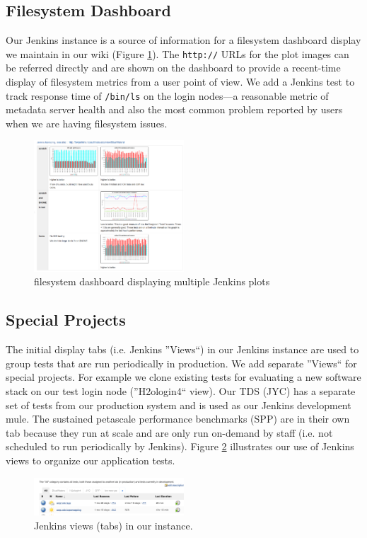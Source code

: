 \documentclass[10pt, conference, compsocconf]{IEEEtran}
\begin{document}
\subsection{Filesystem Dashboard}
Our Jenkins instance is a source of information for a filesystem dashboard display we maintain in our wiki (Figure \ref{fig:wiki-dashboard}). The \texttt{http://} URLs for the plot images can be referred directly and are shown on the dashboard to provide a recent-time display of filesystem metrics from a user point of view. We add a Jenkins test to track response time of \texttt{/bin/ls} on the login nodes---a reasonable metric of metadata server health and also the most common problem reported by users when we are having filesystem issues.
\begin{figure}[H]
\centering
\includegraphics[width=0.5\textwidth]{wiki-dashboard}
\caption{ filesystem dashboard displaying multiple Jenkins plots }
\label{fig:wiki-dashboard}
\end{figure}

\subsection{Special Projects}
The initial display tabs (i.e. Jenkins ''Views``) in our Jenkins instance are used to group tests that are run periodically in production. We add separate ''Views`` for special projects. For example we clone existing tests for evaluating a new software stack on our test login node (''H2ologin4`` view).  Our TDS (JYC) has a separate set of tests from our production system and is used as our Jenkins development mule. The sustained petascale performance benchmarks (SPP) are in their own tab because they run at scale and are only run on-demand by staff (i.e. not scheduled to run periodically by Jenkins). Figure \ref{fig:tabs-display} illustrates our use of Jenkins views to organize our application tests.
\begin{figure}[H]
\centering
\includegraphics[width=0.5\textwidth]{tabs-display}
\caption{Jenkins views (tabs) in our instance.}
\label{fig:tabs-display}
\end{figure}
\end{document}
